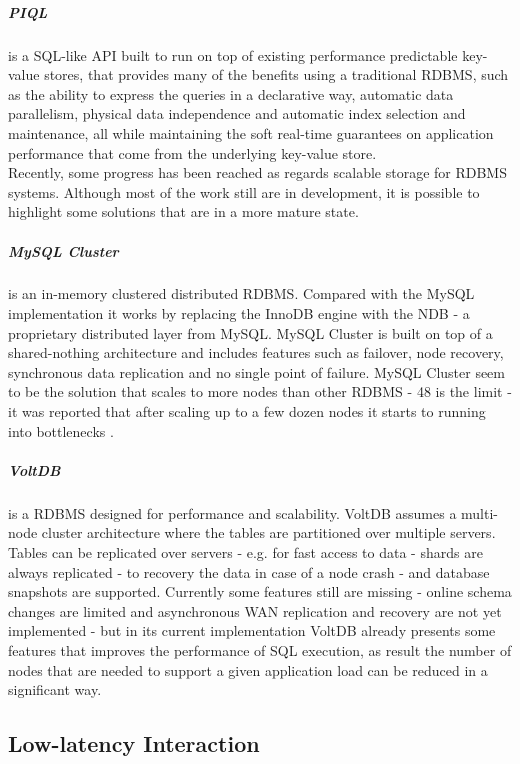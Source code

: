 \subparagraph{\gls{PIQL}} \cite{armbrust2010piql} is a SQL-like API
built to run on top of existing performance predictable key-value stores, that provides many of the benefits
using a traditional \gls{RDBMS}, such as the ability to express the queries in a declarative way, automatic
data parallelism, physical data independence and automatic index selection and maintenance, all while
maintaining the soft real-time guarantees on application performance that come from the underlying
key-value store.\\

Recently, some progress has been reached as regards scalable storage for \gls{RDBMS} systems. Although
most of the work still are in development, it is possible to highlight some solutions that are in a more
mature state.

\subparagraph{MySQL Cluster} \cite{ronstrom2004mysql} is an in-memory clustered distributed \gls{RDBMS}. Compared with
the MySQL implementation it works by replacing the InnoDB engine with the NDB - a proprietary
distributed layer from MySQL. MySQL Cluster is built on top of a shared-nothing architecture and includes
features such as failover, node recovery, synchronous data replication and no single point of failure.
MySQL Cluster seem to be the solution that scales to more nodes than other \gls{RDBMS} - 48 is the limit -
it was reported that after scaling up to a few dozen nodes it starts to running into bottlenecks \cite{bunch2010evaluation}.

\subparagraph{VoltDB} \cite{stonebraker2013voltdb} is a \gls{RDBMS} designed for performance and scalability. VoltDB
assumes a multi-node cluster architecture where the tables are partitioned over multiple servers. Tables
can be replicated over servers - e.g. for fast access to data - shards are always replicated -
to recovery the data in case of a node crash - and database snapshots are supported. Currently some
features still are missing - online schema changes are limited and asynchronous \gls{WAN} replication and
recovery are not yet implemented - but in its current implementation VoltDB already presents some
features that improves the performance of SQL execution, as result the number of nodes that are needed
to support a given application load can be reduced in a significant way.

\subsection{Low-latency Interaction}
\label{sub:low_latency_interaction}


